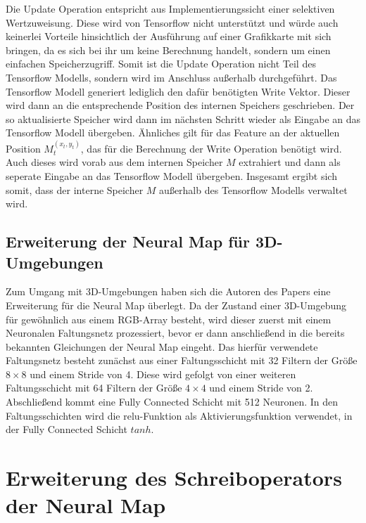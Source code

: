 Die Update Operation entspricht aus Implementierungssicht einer selektiven Wertzuweisung. Diese wird von Tensorflow nicht unterstützt und würde auch keinerlei Vorteile hinsichtlich der Ausführung auf einer Grafikkarte mit sich bringen, da es sich bei ihr um keine Berechnung handelt, sondern um einen einfachen Speicherzugriff. Somit ist die Update Operation nicht Teil des Tensorflow Modells, sondern wird im Anschluss außerhalb durchgeführt. Das Tensorflow Modell generiert lediglich den dafür benötigten Write Vektor. Dieser wird dann an die entsprechende Position des internen Speichers geschrieben. Der so aktualisierte Speicher wird dann im nächsten Schritt wieder als Eingabe an das Tensorflow Modell übergeben. Ähnliches gilt für das Feature an der aktuellen Position $M_t^{(x_t,y_t)}$, das für die Berechnung der Write Operation benötigt wird. Auch dieses wird vorab aus dem internen Speicher $M$ extrahiert und dann als seperate Eingabe an das Tensorflow Modell übergeben. Insgesamt ergibt sich somit, dass der interne Speicher $M$ außerhalb des Tensorflow Modells verwaltet wird.

\subsection{Erweiterung der Neural Map für 3D-Umgebungen}
Zum Umgang mit 3D-Umgebungen haben sich die Autoren des Papers eine Erweiterung für die Neural Map überlegt. Da der Zustand einer 3D-Umgebung für gewöhnlich aus einem RGB-Array besteht, wird dieser zuerst mit einem Neuronalen Faltungsnetz prozessiert, bevor er dann anschließend in die bereits bekannten Gleichungen der Neural Map eingeht. Das hierfür verwendete Faltungsnetz besteht zunächst aus einer Faltungsschicht mit 32 Filtern der Größe $8 \times 8$ und einem Stride von 4. Diese wird gefolgt von einer weiteren Faltungsschicht mit 64 Filtern der Größe $4 \times 4$ und einem Stride von 2. Abschließend kommt eine Fully Connected Schicht mit 512 Neuronen. In den Faltungsschichten wird die relu-Funktion als Aktivierungsfunktion verwendet, in der Fully Connected Schicht $tanh$.


\section{Erweiterung des Schreiboperators der Neural Map}
\label{sec_write_ext}

